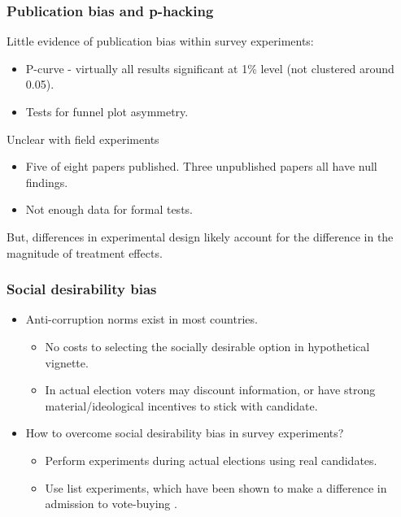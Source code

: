 \documentclass[usenames,dvipsnames]{beamer}
\begin{document}

\begin{frame}
\frametitle{Publication bias and p-hacking}
\textcolor{Cerulean}{Little evidence of publication bias} within survey experiments:
\pause
\begin{itemize}
\item P-curve - virtually all results significant at 1\% level (not clustered around 0.05).
\pause
\item Tests for funnel plot asymmetry. 
\end{itemize}
\pause
Unclear with field experiments
\begin{itemize}
\item Five of eight papers published. Three unpublished papers all have null findings. 
\pause
\item Not enough data for formal tests. 
\end{itemize}
\pause
But, \textcolor{Cerulean}{differences in experimental design} likely account for the difference in the magnitude of treatment effects.

\end{frame}

\begin{frame}
\frametitle{Social desirability bias}
\begin{itemize}
\pause
\item Anti-corruption norms exist in most countries.
\begin{itemize}
\pause
\item No costs to selecting the socially desirable option in hypothetical vignette. 
\pause
\item In actual election voters may discount information, or have strong material/ideological incentives to stick with candidate.
\end{itemize}
\pause
\item How to overcome social desirability bias in survey experiments?
\begin{itemize}
\pause
\item Perform experiments during \textcolor{Cerulean}{actual elections} using real candidates.
\pause
\item Use \textcolor{Cerulean}{list experiments}, which have been shown to make a difference in admission to vote-buying \citep{gonzalez2012vote}.
\end{itemize}
\end{itemize}

\end{frame}
\end{document}
